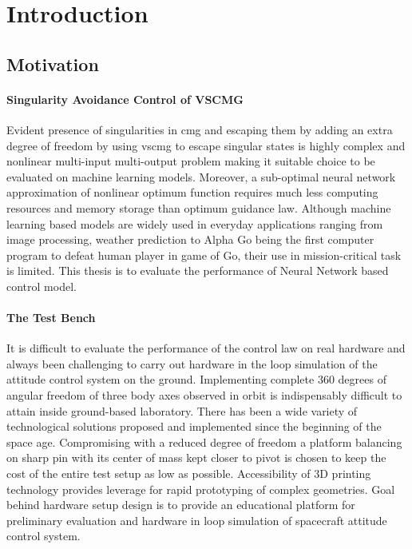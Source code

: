 \chapter{Introduction}
\label{chap:1}
\section{Motivation}


\subsubsection*{Singularity Avoidance Control of VSCMG}
Evident presence of singularities in \acrfull{cmg} and escaping them by adding an extra degree of freedom by using \acrfull{vscmg} to escape singular states is highly complex and nonlinear multi-input multi-output problem making it suitable choice to be evaluated on machine learning models. Moreover, a sub-optimal neural network approximation of nonlinear optimum function requires much less computing resources and memory storage than optimum guidance law\cite{Santoni1996}. Although machine learning based models are widely used in everyday applications ranging from image processing, weather prediction to Alpha Go being the first computer program to defeat human player in game of Go, \cite{Silver2016} their use in mission-critical task is limited.  This thesis is to evaluate the performance of Neural Network based control model. 

\subsubsection*{The Test Bench}
It is difficult to evaluate the performance of the control law on real hardware and always been challenging to carry out hardware in the loop simulation of the attitude control system on the ground. Implementing complete 360 degrees of angular freedom of three body axes observed in orbit is indispensably difficult to attain inside ground-based laboratory. There has been a wide variety of technological solutions proposed and implemented since the beginning of the space age. Compromising with a reduced degree of freedom a platform balancing on sharp pin with its center of mass kept closer to pivot is chosen to keep the cost of the entire test setup as low as possible. 
Accessibility of 3D printing technology provides leverage for rapid prototyping of complex geometries. Goal behind hardware setup design is to provide an educational platform for preliminary evaluation and hardware in loop simulation of spacecraft attitude control system.

